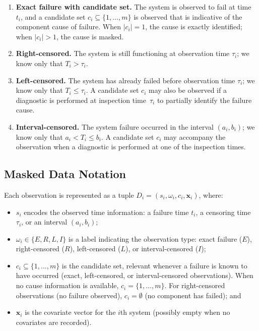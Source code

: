 \documentclass[11pt]{article}
\theoremstyle{definition}
\theoremstyle{plain}
\renewcommand{\v}[1]{\boldsymbol{#1}}
\begin{document}
\begin{enumerate}
    \item \textbf{Exact failure with candidate set.}
    The system is observed to fail at time $t_i$, and a candidate set
    $c_i \subseteq \{1, \ldots, m\}$ is observed that is indicative of
    the component cause of failure.
    When $|c_i| = 1$, the cause is exactly identified;
    when $|c_i| > 1$, the cause is masked.

    \item \textbf{Right-censored.}
    The system is still functioning at observation time $\tau_i$;
    we know only that $T_i > \tau_i$.

    \item \textbf{Left-censored.}
    The system has already failed before observation time $\tau_i$;
    we know only that $T_i \leq \tau_i$.
    A candidate set $c_i$ may also be observed if a diagnostic is
    performed at inspection time~$\tau_i$ to partially identify the
    failure cause.

    \item \textbf{Interval-censored.}
    The system failure occurred in the interval $(a_i, b_i)$;
    we know only that $a_i < T_i \leq b_i$.
    A candidate set $c_i$ may accompany the observation when a
    diagnostic is performed at one of the inspection times.
\end{enumerate}

\subsection{Masked Data Notation}
\label{sec:masked-data-notation}

Each observation is represented as a tuple
$D_i = (s_i, \omega_i, c_i, \v{x}_i)$, where:
\begin{itemize}
    \item $s_i$ encodes the observed time information: a failure time $t_i$,
    a censoring time $\tau_i$, or an interval $(a_i, b_i)$;
    \item $\omega_i \in \{E, R, L, I\}$ is a label indicating the
    observation type: exact failure ($E$), right-censored ($R$),
    left-censored ($L$), or interval-censored ($I$);
    \item $c_i \subseteq \{1, \ldots, m\}$ is the candidate set, relevant
    whenever a failure is known to have occurred (exact, left-censored,
    or interval-censored observations).
    When no cause information is available, $c_i = \{1, \ldots, m\}$.
    For right-censored observations (no failure observed),
    $c_i = \emptyset$ (no component has failed); and
    \item $\v{x}_i$ is the covariate vector for the $i$th system
    (possibly empty when no covariates are recorded).
\end{itemize}
\end{document}
